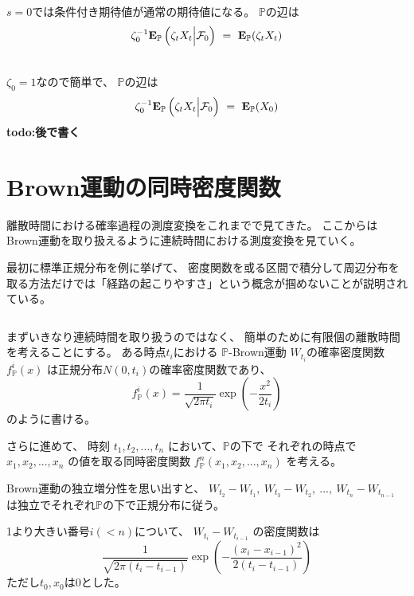\documentclass[uplatex,a4j,12pt,dvipdfmx]{jsarticle}
\begin{document}
	$s=0$では条件付き期待値が通常の期待値になる。
	$\mathbb{P}$の辺は
	\begin{eqnarray*}
		\zeta_{0}^{-1}
		{\bf E}_{\mathbb{P}}
		\left( \zeta_{t} X_{t} \Big| \mathcal{F}_{0} \right)
		\ = \
		{\bf E}_{\mathbb{P}}
		( \zeta_{t} X_{t} )
	\end{eqnarray*}

	\ \\

	$\zeta_{0}=1$なので簡単で、
	$\mathbb{P}$の辺は
	\begin{eqnarray*}
		\zeta_{0}^{-1}
		{\bf E}_{\mathbb{P}}
		\left( \zeta_{t} X_{t} \Big| \mathcal{F}_{0} \right)
		\ = \
		{\bf E}_{\mathbb{P}}
		( X_{0} )
	\end{eqnarray*}
	{\bf todo:後で書く}

\fi

\section{Brown運動の同時密度関数}
離散時間における確率過程の測度変換をこれまでで見てきた。
ここからはBrown運動を取り扱えるように連続時間における測度変換を見ていく。

最初に標準正規分布を例に挙げて、
密度関数を或る区間で積分して周辺分布を取る方法だけでは「経路の起こりやすさ」という概念が掴めないことが説明されている。

${}$

まずいきなり連続時間を取り扱うのではなく、
簡単のために有限個の離散時間を考えることにする。
ある時点$t_{i}$における
$\mathbb{P}$-Brown運動
$W_{t_{i}}$の確率密度関数
$f^{i}_{\mathbb{P}}(x)$
は正規分布$N(0,t_{i})$の確率密度関数であり、
%
$$
	\displaystyle
	f^{i}_{\mathbb{P}}(x)
	=
	\dfrac{1}{ \sqrt{2 \pi t_{i} } }
	\exp \left( {- \frac{x^{2}}{2 t_{i}} } \right)
$$
%
のように書ける。

さらに進めて、
時刻
$t_{1},t_{2},...,t_{n}$
において、$\mathbb{P}$の下で
それぞれの時点で
$x_{1},x_{2},...,x_{n}$
の値を取る同時密度関数
$f^{n}_{\mathbb{P}} (x_{1} , x_{2} , ... ,x_{n})$
を考える。

Brown運動の独立増分性を思い出すと、
$
	W_{t_{2}} - W_{t_{1}}, \
	W_{t_{3}} - W_{t_{2}}, \
	..., \
	W_{t_{n}} - W_{t_{n-1}}
$
は独立でそれぞれ$\mathbb{P}$の下で正規分布に従う。

1より大きい番号$i(<n)$について、
$W_{t_{i}} - W_{t_{i-1}}$
の密度関数は
%
$$
	\displaystyle
	\dfrac{1}{ \sqrt{2 \pi (t_{i} - t_{i-1}) } }
	\exp \left( {- \frac{ (x_{i} - x_{i-1}  )^{2}}{2 ( t_{i} - t_{i-1})  } } \right)
$$
%
ただし$t_{0},x_{0}$は0とした。
\end{document}
